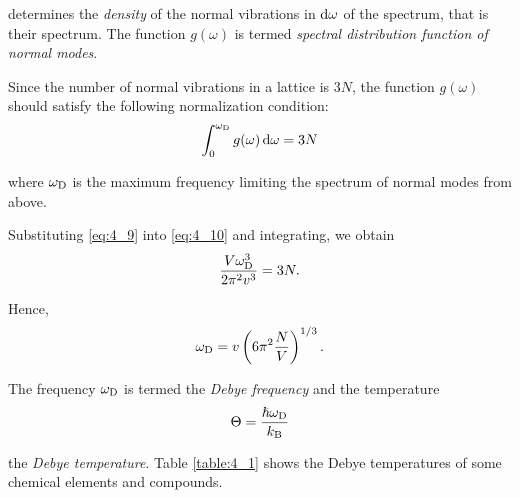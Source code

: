 \noindent
determines the \textit{density} of the normal vibrations in $\mathrm{d}\omega$ of the spectrum, that is their spectrum. The function $g(\omega)$ is termed \textit{spectral distribution function of normal modes}.

Since the number of normal vibrations in a lattice is $3N$, the function $g(\omega)$ should satisfy the following normalization condition:
\begin{equation}\label{eq:4_10}
    \int_0^{\omega_{\text{D}}} g(\omega)\, \mathrm{d}\omega = 3N
\end{equation}

\noindent
where $\omega_{\text{D}}$ is the maximum frequency limiting the spectrum of normal modes from above.

Substituting \eqref{eq:4_9} into \eqref{eq:4_10} and integrating, we obtain
\begin{equation}\label{eq:4_11}
    \frac{V \omega_{\text{D}}^3}{2\pi^2 v^3} = 3N.
\end{equation}

\noindent
Hence,
\begin{equation}\label{eq:4_12}
    \omega_{\text{D}} = v \left(6\pi^2 \frac{N}{V}\right)^{1/3}.
\end{equation}

The frequency $\omega_{\text{D}}$ is termed the \textit{Debye frequency} and the temperature
\begin{equation}\label{eq:4_13}
    \Theta = \frac{\hslash \omega_{\text{D}}}{k_{\text{B}}}
\end{equation}

\noindent
the \textit{Debye temperature}. Table \ref{table:4_1} shows the Debye temperatures of some chemical elements and compounds.

